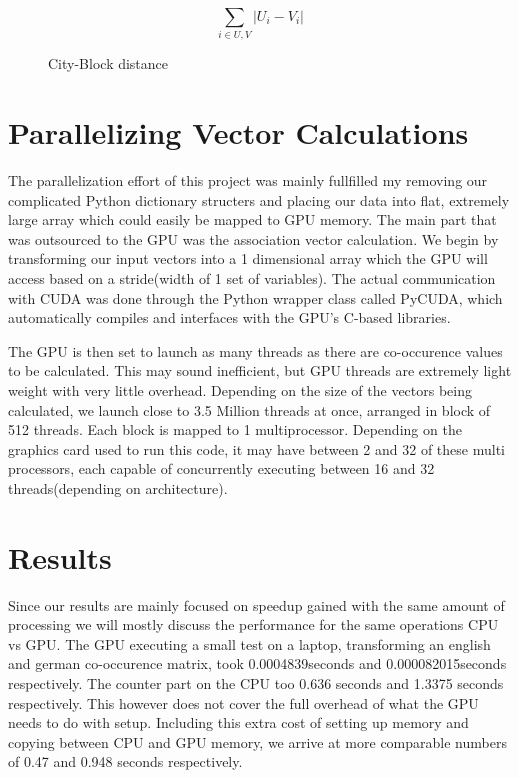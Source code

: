 \documentclass[12pt]{article}
\begin{document}
\begin{figure}
$$\sum_{i\in U,V} |U_i - V_i| $$
\caption{City-Block distance}
  \label{cityblock}
\end{figure}

\section{Parallelizing Vector Calculations}

The parallelization effort of this project was mainly fullfilled my removing our complicated Python dictionary structers and placing our data into flat, extremely large array which could easily be mapped to GPU memory. The main part that was outsourced to the GPU was the association vector calculation. We begin by transforming our input vectors into a 1 dimensional array which the GPU will access based on a stride(width of 1 set of variables). The actual communication with CUDA was done through the Python wrapper class called PyCUDA, which automatically compiles and interfaces with the GPU's C-based libraries.

The GPU is then set to launch as many threads as there are co-occurence values to be calculated. This may sound inefficient, but GPU threads are extremely light weight with very little overhead. Depending on the size of the vectors being calculated, we launch close to 3.5 Million threads at once, arranged in block of 512 threads. Each block is mapped to 1 multiprocessor. Depending on the graphics card used to run this code, it may have between 2 and 32 of these multi processors, each capable of concurrently executing between 16 and 32 threads(depending on architecture).

\section{Results}

Since our results are mainly focused on speedup gained with the same amount of processing we will mostly discuss the performance for the same operations CPU vs GPU. The GPU executing a small test on a laptop, transforming an english and german co-occurence matrix, took 0.0004839seconds and 0.000082015seconds respectively. The counter part on the CPU too 0.636 seconds and 1.3375 seconds respectively. This however does not cover the full overhead of what the GPU needs to do with setup. Including this extra cost of setting up memory and copying between CPU and GPU memory, we arrive at more comparable numbers of 0.47 and 0.948 seconds respectively.
\end{document}
